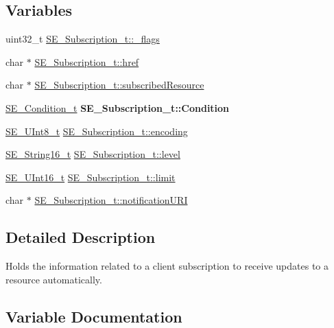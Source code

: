 \subsection*{Variables}
\begin{DoxyCompactItemize}
\item 
uint32\+\_\+t \hyperlink{group__Subscription_ga3ed789b5419270cc9a8a5534048f9da9}{S\+E\+\_\+\+Subscription\+\_\+t\+::\+\_\+flags}
\item 
char $\ast$ \hyperlink{group__Subscription_ga68652b485c042e80274c1c8cd71c9d46}{S\+E\+\_\+\+Subscription\+\_\+t\+::href}
\item 
char $\ast$ \hyperlink{group__Subscription_ga6bb29c2c4620a20e0162662014161d18}{S\+E\+\_\+\+Subscription\+\_\+t\+::subscribed\+Resource}
\item 
\mbox{\label{group__Subscription_ga844b81a5fd88e1e262c1759040f3c849}} 
\hyperlink{structSE__Condition__t}{S\+E\+\_\+\+Condition\+\_\+t} {\bfseries S\+E\+\_\+\+Subscription\+\_\+t\+::\+Condition}
\item 
\hyperlink{group__UInt8_gaf7c365a1acfe204e3a67c16ed44572f5}{S\+E\+\_\+\+U\+Int8\+\_\+t} \hyperlink{group__Subscription_ga96241742b8da02d3964190abedf7ec22}{S\+E\+\_\+\+Subscription\+\_\+t\+::encoding}
\item 
\hyperlink{group__String16_ga96799b35e03c3e6545eb138a7f879015}{S\+E\+\_\+\+String16\+\_\+t} \hyperlink{group__Subscription_gab7978f478f8d68b3c5d1a4f18b13d2ed}{S\+E\+\_\+\+Subscription\+\_\+t\+::level}
\item 
\hyperlink{group__UInt16_gac68d541f189538bfd30cfaa712d20d29}{S\+E\+\_\+\+U\+Int16\+\_\+t} \hyperlink{group__Subscription_ga554e08734299558c7ce58d97a8a27a8d}{S\+E\+\_\+\+Subscription\+\_\+t\+::limit}
\item 
char $\ast$ \hyperlink{group__Subscription_gaa9e106fec3c507732a98db50afb9cc34}{S\+E\+\_\+\+Subscription\+\_\+t\+::notification\+U\+RI}
\end{DoxyCompactItemize}


\subsection{Detailed Description}
Holds the information related to a client subscription to receive updates to a resource automatically. 

\subsection{Variable Documentation}
\mbox{\label{group__Subscription_ga3ed789b5419270cc9a8a5534048f9da9}} 
